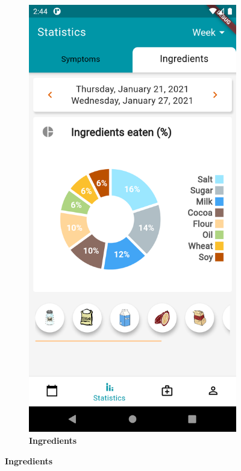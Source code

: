 \documentclass [12pt]{article}
\begin{document}
\begin{description}[leftmargin=1cm,rightmargin=1cm]
\begin{figure}[h!]
\begin{subfigure}[tr]{0.3\linewidth}
\includegraphics[width=\linewidth]{statistics2.PNG}
\caption{\textbf{Ingredients}}
\end{subfigure}
\hspace*{\fill}

\end{figure}
\end{description}
\end{document}
